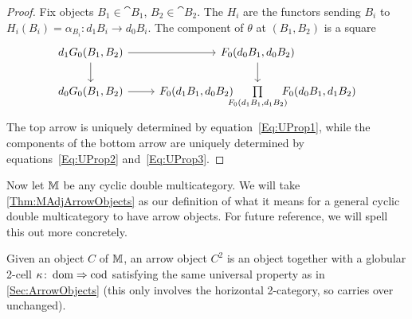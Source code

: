 \begin{proof}
	Fix objects $B_1\in\cat{B}_1$, $B_2\in\cat{B}_2$. The $H_i$ are the functors sending $B_i$ to $H_i(B_i)=\alpha_{B_i}\colon d_1B_i\to d_0B_i$. The component of $\theta$ at $(B_1,B_2)$ is a square
	\[
	\begin{tikzcd}
	d_1G_0(B_1,B_2) \rar \dar
	& F_0(d_0B_1,d_0B_2) \dar \\
	d_0G_0(B_1,B_2) \rar
	& F_0(d_1B_1,d_0B_2) \!\!\! \underset{F_0(d_1B_1,d_1B_2)}{\prod} \!\!\! F_0(d_0B_1,d_1B_2)
	\end{tikzcd}
	\]
	The top arrow is uniquely determined by equation~\eqref{Eq:UProp1}, while the components of the bottom arrow are uniquely determined by equations~\eqref{Eq:UProp2} and~\eqref{Eq:UProp3}.
\end{proof}

Now let $\mathbb{M}$ be any cyclic double multicategory. We will take \cref{Thm:MAdjArrowObjects} as our definition of what it means for a general cyclic double multicategory to have arrow objects. For future reference, we will spell this out more concretely.

Given an object $C$ of $\mathbb{M}$, an arrow object $C^2$ is an object together with a globular 2-cell $\kappa\colon\operatorname{dom}\Rightarrow\operatorname{cod}$ satisfying the same universal property as in \cref{Sec:ArrowObjects} (this only involves the horizontal 2-category, so carries over unchanged).

